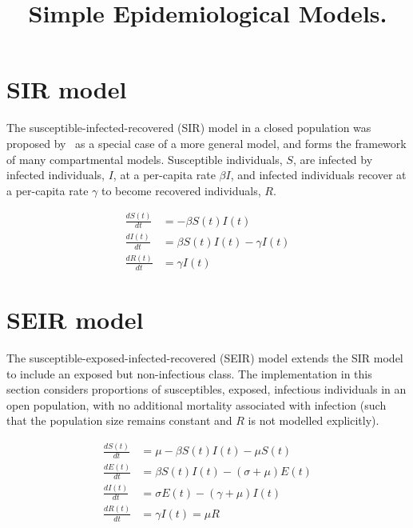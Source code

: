 \documentclass{article}
\begin{document}
\title{Simple Epidemiological Models.}

\maketitle

\section{SIR model}

The susceptible-infected-recovered (SIR) model in a closed population was
proposed by~\cite{kermack1927contribution} as a special case of a more general
model, and forms the framework of many compartmental models.  Susceptible
individuals, $S$, are infected by infected individuals, $I$, at a per-capita
rate $\beta I$, and infected individuals recover at a per-capita rate $\gamma$
to become recovered individuals, $R$.

\begin{align}
\frac{dS(t)}{dt} &= -\beta S(t) I(t)\\
\frac{dI(t)}{dt} &= \beta S(t) I(t)- \gamma I(t)\\
\frac{dR(t)}{dt} &= \gamma I(t)
\end{align}

\section{SEIR model}

The susceptible-exposed-infected-recovered (SEIR) model extends the SIR model
to include an exposed but non-infectious class. The implementation in this
section considers proportions of susceptibles, exposed, infectious individuals
in an open population, with no additional mortality associated with infection
(such that the population size remains constant and $R$ is not modelled
explicitly).

\begin{align}
\frac{dS(t)}{dt} &= \mu-\beta S(t) I(t) - \mu S(t)\\
\frac{dE(t)}{dt} &= \beta S(t) I(t)- (\sigma + \mu) E(t)\\
\frac{dI(t)}{dt} &= \sigma E(t)- (\gamma + \mu) I(t)\\
\frac{dR(t)}{dt} &= \gamma I(t) = \mu R
\end{align}



\end{document}
